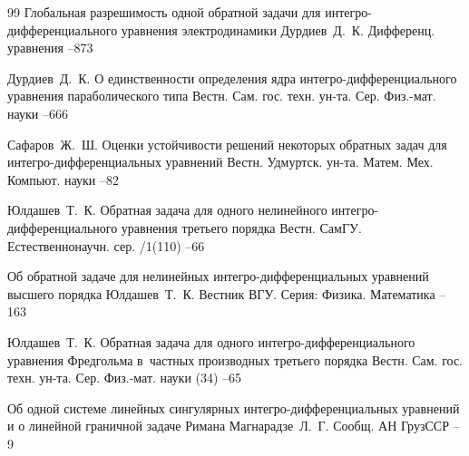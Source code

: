 {\begin{thebibliography}{99}
\paper Глобальная разрешимость одной обратной задачи для интегро-дифференциального уравнения электродинамики
\by Дурдиев~Д.~К.
\jour Дифференц. уравнения
--873

\by Дурдиев~Д.~К.
\paper О единственности определения  ядра интегро-дифференциального уравнения параболического типа
\jour Вестн. Сам. гос. техн. ун-та. Сер. Физ.-мат. науки
--666


\by Сафаров~Ж.~Ш.
\paper Оценки устойчивости решений некоторых обратных  задач для интегро-дифференциальных уравнений
\jour Вестн. Удмуртск. ун-та. Матем. Мех. Компьют. науки
--82


\by Юлдашев~Т.~К.
\paper Обратная задача для одного нелинейного интегро-дифференциального уравнения третьего порядка
\jour Вестн. СамГУ. Естественнонаучн. сер.
/1(110)
--66

\paper Об обратной задаче для нелинейных интегро-дифференциальных уравнений высшего порядка
\by Юлдашев~Т.~К.
\jour Вестник ВГУ. Серия: Физика. Математика
--163

\by Юлдашев~Т.~К.
\paper Обратная задача для одного интегро-дифференциального уравнения Фредгольма  в~частных производных третьего порядка
\jour Вестн. Сам. гос. техн. ун-та. Сер. Физ.-мат. науки
(34)
--65


\paper Об одной системе линейных сингулярных интегро-дифференциальных уравнений и о линейной граничной задаче Римана
\by Магнарадзе~Л.~Г.
\jour Сообщ. АН ГрузССР
--9


\end{thebibliography}}
